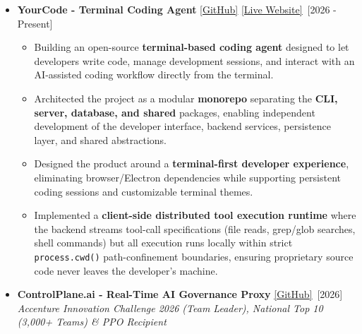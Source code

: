 \documentclass[a4paper,10pt]{article}
\newcommand{\isep}{-2 pt}
\begin{document}
\begin{itemize}\itemsep \isep



    \item \textbf{YourCode - Terminal Coding Agent} \underline{\href{https://github.com/devvrat-hans/yourcode}{[GitHub]}} \underline{\href{https://yourcode.space}{[Live Website]}}\ \hfill [2026 - Present]\\[-0.7cm]

    \begin{itemize}\itemsep \isep

        \item Building an open-source \textbf{terminal-based coding agent} designed to let developers write code, manage development sessions, and interact with an AI-assisted coding workflow directly from the terminal.

        \item Architected the project as a modular \textbf{monorepo} separating the \textbf{CLI, server, database, and shared} packages, enabling independent development of the developer interface, backend services, persistence layer, and shared abstractions.

        \item Designed the product around a \textbf{terminal-first developer experience}, eliminating browser/Electron dependencies while supporting persistent coding sessions and customizable terminal themes.

        \item Implemented a \textbf{client-side distributed tool execution runtime} where the backend streams tool-call specifications (file reads, grep/glob searches, shell commands) but all execution runs locally within strict \texttt{process.cwd()} path-confinement boundaries, ensuring proprietary source code never leaves the developer's machine.
        
    \end{itemize}



    \item \textbf{ControlPlane.ai - Real-Time AI Governance Proxy} \underline{\href{https://github.com/devvrat-hans/controlplane-ai}{[GitHub]}}\ \hfill [2026] \\
    \textit{Accenture Innovation Challenge 2026 (Team Leader), National Top 10 (3,000+ Teams) \& PPO Recipient}
    \\[-0.7cm]


\end{itemize}
\end{document}
